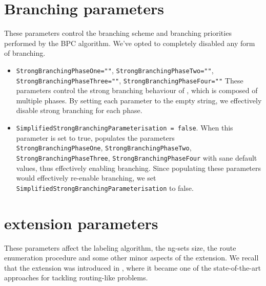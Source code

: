 \section{Branching parameters}
These parameters control the branching scheme and branching priorities performed by the BPC algorithm.
We've opted to completely disabled any form of branching.

\begin{itemize}
	\item \texttt{StrongBranchingPhaseOne=""}, \texttt{StrongBranchingPhaseTwo=""}, \texttt{StrongBranchingPhaseThree=""}, \texttt{StrongBranchingPhaseFour=""}
	      These parameters control the strong branching behaviour of \bapcod{}, which is composed of multiple phases.
	      By setting each parameter to the empty string, we effectively disable strong branching for each phase.
	\item \texttt{SimplifiedStrongBranchingParameterisation = false}.
	      When this parameter is set to true, \bapcod{} populates the parameters \texttt{StrongBranchingPhaseOne}, \texttt{StrongBranchingPhaseTwo}, \texttt{StrongBranchingPhaseThree}, \texttt{StrongBranchingPhaseFour}
	      with sane default values, thus effectively enabling branching.
	      Since populating these parameters would effectively re-enable branching, we set \texttt{SimplifiedStrongBranchingParameterisation} to false.
\end{itemize}

\section{\vrpsolver{} extension parameters}

These parameters affect the labeling algorithm, the ng-sets size,
the route enumeration procedure and some other minor aspects of the \vrpsolver{} extension.
We recall that the \vrpsolver{} extension was introduced in \textcite{pessoa2020generic},
where it became one of the state-of-the-art approaches for tackling routing-like problems.

